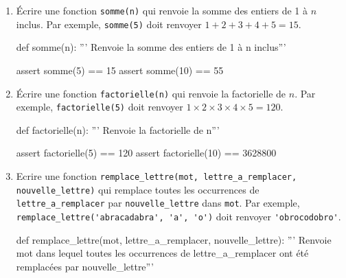 	\begin{exercice_cours}[Boucle FOR]

		\begin{enumerate}
			\item Écrire une fonction \verb|somme(n)| qui renvoie la somme des entiers de 1 à $n$ inclus. Par exemple, \verb|somme(5)| doit renvoyer $1+2+3+4+5=15$.
			
			\begin{CodePythontexAlt}[TaillePolice=\normalsize, Largeur=1\linewidth,Centre,PremLigne=1,Lignes=false,]{}
				def somme(n):
					''' Renvoie la somme des entiers de 1 à n inclus'''
					
					


					
					
				

				assert somme(5) == 15
				assert somme(10) == 55
				\end{CodePythontexAlt}

				\pagebreak
				
			\item Écrire une fonction \verb|factorielle(n)| qui renvoie la factorielle de $n$. Par exemple, \verb|factorielle(5)| doit renvoyer $1\times2\times3\times4\times5=120$.
			
			\begin{CodePythontexAlt}[TaillePolice=\normalsize, Largeur=1\linewidth,Centre,PremLigne=1,Lignes=false,]{}
				def factorielle(n):
					''' Renvoie la factorielle de n'''
					
					
					

					
				
				assert factorielle(5) == 120
				assert factorielle(10) == 3628800
				\end{CodePythontexAlt}
			\item Ecrire une fonction \verb|remplace_lettre(mot, lettre_a_remplacer, nouvelle_lettre)| qui remplace toutes les occurrences de \verb|lettre_a_remplacer| par \verb|nouvelle_lettre| dans \verb|mot|. Par exemple, \verb|remplace_lettre('abracadabra', 'a', 'o')| doit renvoyer \verb+'obrocodobro'+.
			\begin{CodePythontexAlt}[TaillePolice=\normalsize, Largeur=1\linewidth,Centre,PremLigne=1,Lignes=false,]{}
				def remplace_lettre(mot, lettre_a_remplacer, nouvelle_lettre):
					''' Renvoie mot dans lequel toutes les occurrences de 
					lettre_a_remplacer ont été remplacées par nouvelle_lettre'''
					
					




\end{CodePythontexAlt}
\end{enumerate}
\end{exercice_cours}
